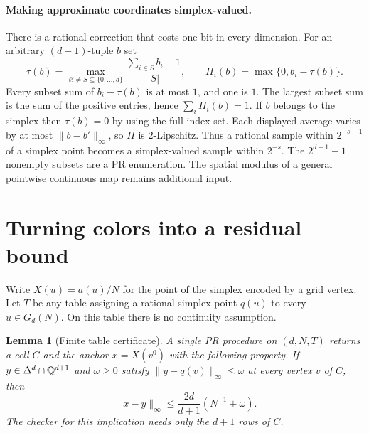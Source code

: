 \documentclass[11pt,letterpaper]{article}
\newcommand{\norm}[1]{\lVert #1\rVert_\infty}
\theoremstyle{claim}\newtheorem{theorem}{Theorem}\newtheorem{lemma}[theorem]{Lemma}
\begin{document}
\paragraph{Making approximate coordinates simplex-valued.}
There is a rational correction that costs one bit in every dimension.
For an arbitrary $(d+1)$-tuple $b$ set
\[
 \tau(b)=\max_{\varnothing\ne S\subseteq\{0,\ldots,d\}}
       \frac{\sum_{i\in S} b_i-1}{|S|},\qquad
 \Pi_i(b)=\max\{0,b_i-\tau(b)\}.
\]
Every subset sum of $b_i-\tau(b)$ is at most $1$, and one is $1$.
The largest subset sum is the sum of the positive entries, hence
$\sum_i\Pi_i(b)=1$. If $b$ belongs to the simplex then $\tau(b)=0$
by using the full index set. Each displayed average varies by at most
$\norm{b-b'}$, so $\Pi$ is $2$-Lipschitz. Thus a rational sample within
$2^{-s-1}$ of a simplex point becomes a simplex-valued sample within
$2^{-s}$. The $2^{d+1}-1$ nonempty subsets are a PR enumeration.
The spatial modulus of a general pointwise continuous map remains
additional input.



\section{Turning colors into a residual bound}\label{sec:residual}
Write $X(u)=a(u)/N$ for the point of the simplex encoded by a grid vertex.
Let $T$ be any table assigning a rational simplex point $q(u)$ to every
$u\in G_d(N)$. On this table there is no continuity assumption.

\begin{lemma}[Finite table certificate]\label{lem:finite}
A single PR procedure on $(d,N,T)$ returns a cell $C$ and the anchor
$x=X(v^0)$ with the following property. If $y\in\Delta^d\cap\mathbb Q^{d+1}$
and $\omega\ge0$ satisfy $\norm{y-q(v)}\le\omega$ at every vertex $v$
of $C$, then
\[
                     \norm{x-y}\le\frac{2d}{d+1}(N^{-1}+\omega).
\]
The checker for this implication needs only the $d+1$ rows of $C$.
\end{lemma}
\end{document}
